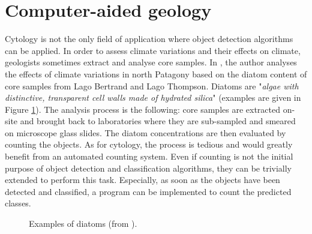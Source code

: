 \section{Computer-aided geology}
Cytology is not the only field of application where object detection algorithms can be applied. In order to assess climate variations and their effects on climate, geologists sometimes extract and analyse core samples. In  \cite{vsacre2011}, the author analyses the effects of climate variations in north Patagony based on the diatom content of core samples from Lago Bertrand and Lago Thompson. Diatoms are "\textit{algae with distinctive, transparent cell walls made of hydrated silica}" \cite{diatoms2016} (examples are given in Figure \ref{fig:diatoms}). The analysis process is the following: core samples are extracted on-site and brought back to laboratories where they are sub-sampled and smeared on microscope glass slides. The diatom concentrations are then evaluated by counting the objects. As for cytology, the process is tedious and would greatly benefit from an automated counting system. Even if counting is not the initial purpose of object detection and classification algorithms, they can be trivially extended to perform this task. Especially, as soon as the objects have been detected and classified, a program can be implemented to count the predicted classes.

\begin{figure}
	\center
	\caption{Examples of diatoms (from \cite{vsacre2011}).}
	\label{fig:diatoms}
\end{figure}